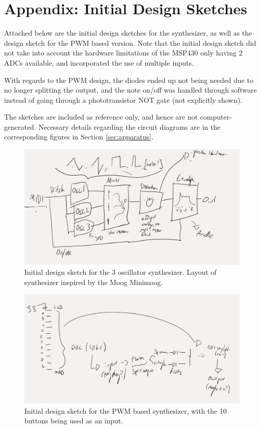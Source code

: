 \documentclass[12pt]{article}
\begin{document}
\section{Appendix: Initial Design Sketches}

Attached below are the initial design sketches for the synthesizer, as well as the design sketch for the PWM based version. Note that the initial design sketch did not take into account the hardware limitations of the MSP430 only having 2 ADCs available, and incorporated the use of multiple inputs. 

With regards to the PWM design, the diodes ended up not being needed due to no longer splitting the output, and the note on/off was handled through software instead of going through a phototransistor NOT gate (not explicitly shown). 

The sketches are included as reference only, and hence are not computer-generated. Necessary details regarding the circuit diagrams are in the corresponding figures in Section \ref{sec:apparatus}. 

\begin{figure}[H]
    \centering
    \includegraphics[width = 0.9 \textwidth]{initialsketch.png}
    \caption{Initial design sketch for the 3 oscillator synthesizer. Layout of synthesizer inspired by the Moog Minimoog.}
    \label{fig:initialsketch}
\end{figure}

\begin{figure}[H]
    \centering
    \includegraphics[width = 0.9 \textwidth]{pwmsynthsketch.png}
    \caption{Initial design sketch for the PWM based synthesizer, with the 10 buttons being used as an input.}
    \label{fig:pwmsketch}
\end{figure}
\end{document}
